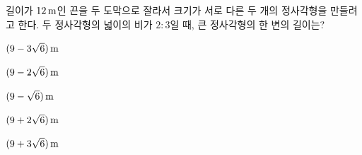길이가 $12\mkern3mu \mathrm{m}$인 끈을 두 도막으로 잘라서 크기가 서로 다른 두 개의 정사각형을 만들려고 한다. 두 정사각형의 넓이의 비가 $2:3$일 때, 큰 정사각형의 한 변의 길이는?
\begin{choices32}{\rule[-3ex]{0pt}{8ex}$(9-3\sqrt{6})\mkern3mu \mathrm{m}$}{\rule[-3ex]{0pt}{8ex}$(9-2\sqrt{6})\mkern3mu \mathrm{m}$}{\rule[-3ex]{0pt}{8ex}$(9-\sqrt{6})\mkern3mu \mathrm{m}$}{\rule[-3ex]{0pt}{8ex}$(9+2\sqrt{6})\mkern3mu \mathrm{m}$}{\rule[-3ex]{0pt}{8ex}$(9+3\sqrt{6})\mkern3mu \mathrm{m}$}\end{choices32}
